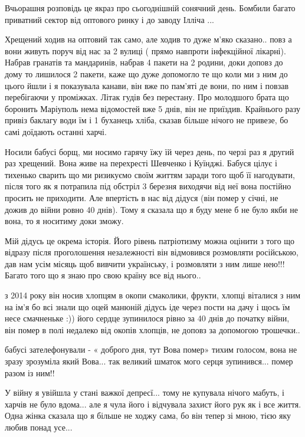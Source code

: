  
 
 
 
 

\qqSecCmt


Вчьорашня розповідь це якраз про сьогоднішній сонячний день. Бомбили багато
приватний сектор від оптового ринку і до заводу Ілліча ...

Хрещений ходив на оптовий так само, але ходив то дуже м'яко сказано.. повз а
вони живуть поруч від нас за 2 вулиці ( прямо навпроти інфекційної лікарні).
Набрав гранатів та мандаринів, набрав 4 пакети на 2 родини, доки доповз до дому
то лишилося 2 пакети, каже що дуже допомогло те що коли ми з ним до цього йшли
і я показувала канави, він вже по пам'яті де вони, по ним і повзав перебігаючи
у проміжках. Літак гудів без перестану. Про молодшого брата що боронить
Маріуполь нема відомостей вже 5 днів, він не приїздив. Крайнього разу привіз
баклагу води їм і 1 буханець хліба, сказав більше нічого не привезе, бо самі
доїдають останні харчі.

Носили бабусі борщ, ми носимо гарячу їжу їй через день, по черзі раз я другий
раз хрещений. Вона живе на перехресті Шевченко і Куїнджі. Бабуся цілує і
тихенько сварить що ми ризикуємо своїм життям заради того щоб її нагодувати,
після того як я потрапила під обстріл 3 березня виходячи від неї вона постійно
просить не приходити. Але впертість в нас від дідуся (він помер у січні, не
дожив до війни ровно 40 днів). Тому я сказала що я буду мене б не було якби не
вона, то я носитиму доки зможу.


Мій дідусь це окрема історія. Його рівень патріотизму можна оцінити з того що
відразу після проголошення незалежності він відмовився розмовляти російською,
дав нам усім місяць щоб вивчити українську, і розмовляти з ним лише нею!!!
Багато того що я знаю про свою країну все від нього..

з 2014 року він носив хлопцям в окопи смаколики, фрукти, хлопці віталися з ним
на ім'я бо всі знали що оцей манюній дідусь іде через пости на дачу і щось їм
несе смачненьке :)) його сердце зупинилося рівно за 40 днів до початку війни,
він помер в полі недалеко від окопів хлопців, не доповз за допомогою трошечки..

бабусі зателефонували - « доброго дня, тут Вова помер» тихим голосом, вона не
зразу зрозуміла який Вова... так великий шматок мого серця зупинився... помер разом
із ним!!

У війну я увійшла у стані важкої депресї... тому не купувала нічого мабуть, і
харчів не було вдома... але я чула його і відчувала захист його рук як і все
життя. Одна жінка сказала що я більше не ходжу сама, бо він тепер зі мною, тією
яку любив понад усе...
